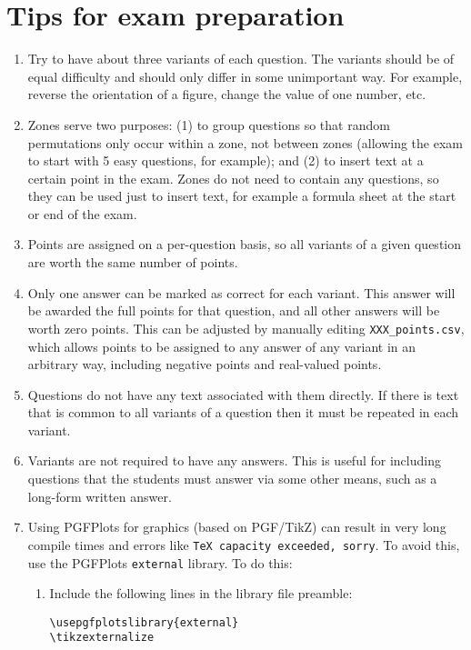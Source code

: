 \documentclass{article}
\begin{document}
\section{Tips for exam preparation}

\begin{enumerate}
\item Try to have about three variants of each question. The variants
  should be of equal difficulty and should only differ in some
  unimportant way. For example, reverse the orientation of a figure,
  change the value of one number, etc.
\item Zones serve two purposes: (1) to group questions so that random
  permutations only occur within a zone, not between zones (allowing
  the exam to start with 5 easy questions, for example); and (2) to
  insert text at a certain point in the exam. Zones do not need to
  contain any questions, so they can be used just to insert text, for
  example a formula sheet at the start or end of the exam.
\item Points are assigned on a per-question basis, so all variants of
  a given question are worth the same number of points.
\item Only one answer can be marked as correct for each variant. This
  answer will be awarded the full points for that question, and all
  other answers will be worth zero points. This can be adjusted by
  manually editing \texttt{XXX_points.csv}, which allows points to be
  assigned to any answer of any variant in an arbitrary way, including
  negative points and real-valued points.
\item Questions do not have any text associated with them directly. If
  there is text that is common to all variants of a question then it
  must be repeated in each variant.
\item Variants are not required to have any answers. This is useful
  for including questions that the students must answer via some other
  means, such as a long-form written answer.
\item Using PGFPlots for graphics (based on PGF/TikZ) can result in
  very long compile times and errors like \texttt{TeX capacity
    exceeded, sorry}. To avoid this, use the PGFPlots
  \texttt{external} library. To do this:
  \begin{enumerate}
  \item Include the following lines in the library file preamble:
\begin{verbatim}
\usepgfplotslibrary{external}
\tikzexternalize
\end{verbatim}

\end{enumerate}
\end{enumerate}
\end{document}
